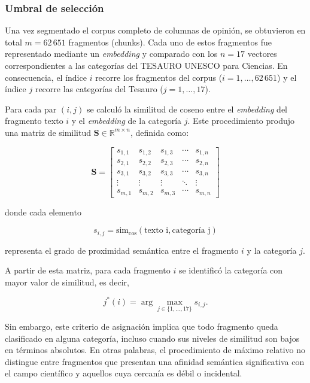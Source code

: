\documentclass[11pt,a4paper]{article}
\begin{document}
	\subsubsection{Umbral de selección}

Una vez segmentado el corpus completo de columnas de opinión, se obtuvieron en total $m = 62\,651$ fragmentos (chunks). Cada uno de estos fragmentos fue representado mediante un \emph{embedding} y comparado con los $n = 17$ vectores correspondientes a las categorías del TESAURO UNESCO para Ciencias. En consecuencia, el índice $i$ recorre los fragmentos del corpus ($i = 1, \dots, 62\,651$) y el índice $j$ recorre las categorías del Tesauro ($j = 1, \dots, 17$).

Para cada par $(i,j)$ se calculó la similitud de coseno entre el \emph{embedding} del fragmento texto $i$ y el \emph{embedding} de la categoría $j$. Este procedimiento produjo una matriz de similitud $\mathbf{S} \in \mathbb{R}^{m \times n}$, definida como:

\begin{equation}
	\mathbf{S} =
	\begin{bmatrix}
		s_{1,1} & s_{1,2} & s_{1,3} & \cdots & s_{1,n} \\
		s_{2,1} & s_{2,2} & s_{2,3} & \cdots & s_{2,n} \\
		s_{3,1} & s_{3,2} & s_{3,3} & \cdots & s_{3,n} \\
		\vdots  & \vdots  & \vdots  & \ddots & \vdots  \\
		s_{m,1} & s_{m,2} & s_{m,3} & \cdots & s_{m,n}
	\end{bmatrix}
\end{equation}

donde cada elemento

\[
s_{i,j} = \text{sim}_{\cos}(\text{texto i}, \text{categoría j})
\]

representa el grado de proximidad semántica entre el fragmento $i$ y la categoría $j$.

A partir de esta matriz, para cada fragmento $i$ se identificó la categoría con mayor valor de similitud, es decir,

\[
j^*(i) = \arg\max_{j \in \{1,\dots,17\}} s_{i,j}.
\]

Sin embargo, este criterio de asignación implica que todo fragmento queda clasificado en alguna categoría, incluso cuando sus niveles de similitud son bajos en términos absolutos. En otras palabras, el procedimiento de máximo relativo no distingue entre fragmentos que presentan una afinidad semántica significativa con el campo científico y aquellos cuya cercanía es débil o incidental.
\end{document}
